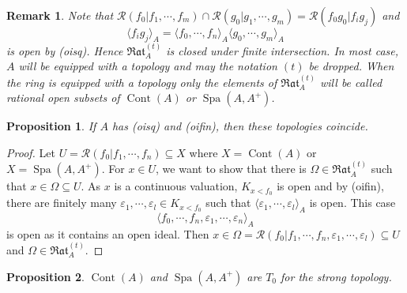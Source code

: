 \documentclass[8pt]{article}
\numberwithin{equation}{section}
\newtheorem{proposition}{Proposition}[subsection]
\newtheorem{remark}{Remark}[subsection]
\DeclareMathOperator{\Spa}{Spa}
\DeclareMathOperator{\Cont}{Cont}
\newcommand{\cR}[0]{\mathcal{R}}
\newcommand{\Rat}[0]{\mathfrak{Rat}}
\begin{document}
\begin{remark}
    Note that $\cR(f_0|f_1,\cdots,f_m)\cap\cR(g_0|g_1,\cdots,g_m) = \cR(f_0g_0|f_ig_j)$ and 
    \begin{equation*}
        \langle f_ig_j\rangle_A = \langle f_0,\cdots,f_n \rangle_A \langle g_0,\cdots,g_m\rangle_A
    \end{equation*} 
    is open by (oisq). Hence $\Rat_A^{(t)}$ is closed under finite intersection. In most case, $A$ will be equipped with a topology and may the notation $(t)$ be dropped.
    When the ring is equipped with a topology only the elements of $\Rat_A^{(t)}$ will be called rational open subsets of $\Cont(A)$ or $\Spa(A,A^+)$.
\end{remark}
\begin{proposition}
    \label{fact_14_9}
    If $A$ has (oisq) and (oifin), then these topologies coincide.
\end{proposition}
\begin{proof}
    Let $U = \cR(f_0|f_1,\cdots,f_n)\subseteq X$ where $X=\Cont(A)$ or $X=\Spa(A,A^+)$. For $x\in U$, we want to show that there is $\Omega\in\Rat_A^{(t)}$ such that $x\in\Omega\subseteq U$. As $x$ is a continuous valuation, $K_{x<f_0}$ is open and by (oifin), there are finitely many $\varepsilon_1,\cdots,\varepsilon_l\in K_{x<f_0}$ such that $\langle \varepsilon_1,\cdots,\varepsilon_l\rangle_A$ is open. 
    This case 
    \begin{equation*}
        \langle f_0,\cdots,f_n,\varepsilon_1,\cdots,\varepsilon_n\rangle_A
    \end{equation*}
    is open as it contains an open ideal. Then $x\in\Omega=\cR(f_0|f_1,\cdots,f_n,\varepsilon_1,\cdots,\varepsilon_l)\subseteq U$ and $\Omega\in\Rat_A^{(t)}$. 
\end{proof}
\begin{proposition}
    \label{fact_14_10}
    $\Cont(A)$ and $\Spa(A,A^+)$ are $T_0$ for the strong topology. %
\end{proposition}
\end{document}
